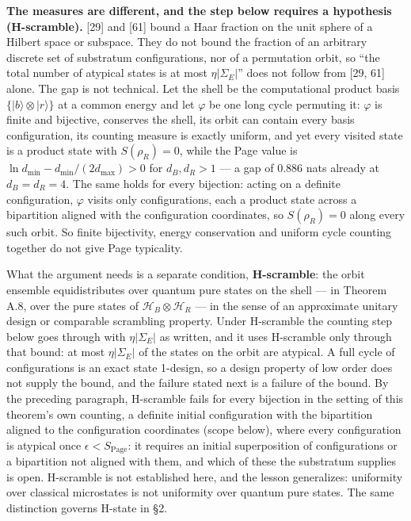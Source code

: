 \documentclass[
]{article}
\begin{document}
\textbf{The measures are different, and the step below requires a
hypothesis (H-scramble).} {[}29{]} and {[}61{]} bound a Haar fraction on
the unit sphere of a Hilbert space or subspace. They do not bound the
fraction of an arbitrary discrete set of substratum configurations, nor
of a permutation orbit, so ``the total number of atypical states is at
most \(\eta|\Sigma_E|\)'' does not follow from {[}29, 61{]} alone. The
gap is not technical. Let the shell be the computational product basis
\(\{|b\rangle\otimes|r\rangle\}\) at a common energy and let \(\varphi\)
be one long cycle permuting it: \(\varphi\) is finite and bijective,
conserves the shell, its orbit can contain every basis configuration,
its counting measure is exactly uniform, and yet every visited state is
a product state with \(S(\rho_R)=0\), while the Page value is
\(\ln d_{\min}-d_{\min}/(2d_{\max})>0\) for \(d_B,d_R>1\) --- a gap of
\(0.886\) nats already at \(d_B=d_R=4\). The same holds for every
bijection: acting on a definite configuration, \(\varphi\) visits only
configurations, each a product state across a bipartition aligned with
the configuration coordinates, so \(S(\rho_R) = 0\) along every such
orbit. So finite bijectivity, energy conservation and uniform cycle
counting together do not give Page typicality.

What the argument needs is a separate condition, \textbf{H-scramble}:
the orbit ensemble equidistributes over quantum pure states on the shell
--- in Theorem A.8, over the pure states of
\(\mathcal{H}_B \otimes \mathcal{H}_R\) --- in the sense of an
approximate unitary design or comparable scrambling property. Under
H-scramble the counting step below goes through with \(\eta|\Sigma_E|\)
as written, and it uses H-scramble only through that bound: at most
\(\eta|\Sigma_E|\) of the states on the orbit are atypical. A full cycle
of configurations is an exact state 1-design, so a design property of
low order does not supply the bound, and the failure stated next is a
failure of the bound. By the preceding paragraph, H-scramble fails for
every bijection in the setting of this theorem's own counting, a
definite initial configuration with the bipartition aligned to the
configuration coordinates (scope below), where every configuration is
atypical once \(\epsilon < S_{\text{Page}}\): it requires an initial
superposition of configurations or a bipartition not aligned with them,
and which of these the substratum supplies is open. H-scramble is not
established here, and the lesson generalizes: uniformity over classical
microstates is not uniformity over quantum pure states. The same
distinction governs H-state in §2.
\end{document}
